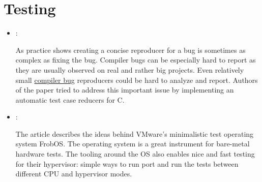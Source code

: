 \section*{Testing}
\begin{itemize}
    \item \cite{Regehr:C-Reduce:2012}:

    As practice shows creating a concise reproducer for a bug is sometimes as complex as fixing the bug. Compiler bugs can be especially hard to report as they are usually observed on real and rather big projects. Even relatively small \href{https://yulyugin.github.io/blog/2022/icc-bug}{compiler bug} reproducers could be hard to analyze and report. Authors of the paper tried to address this important issue by implementing an automatic test case reducers for C.

    \item \cite{Easson:FrobOS:2012}:

    The article describes the ideas behind VMware's minimalistic test operating system FrobOS. Tbe operating system is a great instrument for bare-metal hardware tests. The tooling around the OS also enables nice and fast testing for their hypervisor: simple ways to run port and run the tests between different CPU and hypervisor modes.
\end{itemize}

